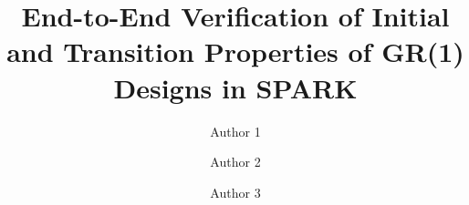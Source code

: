 \documentclass[runningheads]{llncs}
\begin{document}
\lstset{language=Ada}
\lstset{basicstyle=\ttfamily}
%
\title{\large End-to-End Verification of Initial and Transition Properties of GR(1) Designs in SPARK}

%
%
\author{Author 1 \and
Author 2 \and
Author 3}

%

\end{document}

